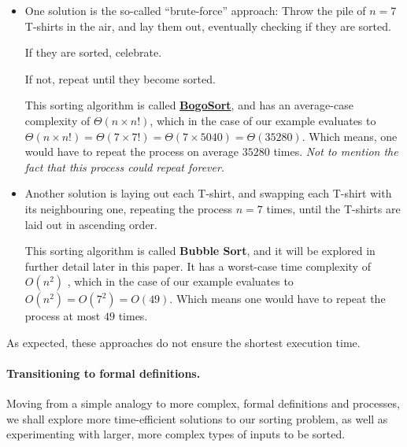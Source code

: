 \documentclass[a4paper]{article}
\begin{document}
            \begin{itemize}
                \item
                    One solution is the so-called ``brute-force'' approach: \newline
                    Throw the pile of \(n = 7\) T-shirts in the air, and lay them out, eventually checking if they are sorted. 
                    
                    \noindent If they are sorted, celebrate. 
                    
                    \noindent If not, repeat until they become sorted.


                    This sorting algorithm is called \href{https://en.wikipedia.org/wiki/Bogosort}{\textbf{BogoSort}}, and has an average-case complexity of \(\Theta(n \times n!)\)\supercite{sorting_the_slow_way}, which in the case of our example evaluates to \(\Theta(n \times n!) = \Theta(7 \times 7!) = \Theta(7 \times 5040) = \Theta(35280)\).
                    Which means, one would have to repeat the process on average \(35280\) times. \emph{Not to mention the fact that this process could repeat forever.}

                \item 
                    Another solution is laying out each T-shirt, and swapping each T-shirt with its neighbouring one, repeating the process \(n = 7\) times, until the T-shirts are laid out in ascending order.

                    This sorting algorithm is called \textbf{Bubble Sort}, and it will be explored in further detail later in this paper.
                    It has a worst-case time complexity of \(O(n^2)\)%
                    , which in the case of our example evaluates to \(O(n^2) = O(7^2) = O(49)\).
                    Which means one would have to repeat the process at most \(49\) times.

            \end{itemize}

            \noindent As expected, these approaches do not ensure the shortest execution time.
            \vspace*{1em}
            
            \paragraph{Transitioning to formal definitions.} Moving from a simple analogy to more complex, formal definitions and processes, we shall explore more time-efficient solutions to our sorting problem, as well as experimenting with larger, more complex types of inputs to be sorted.
        
\end{document}
